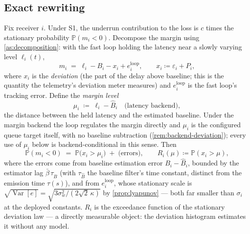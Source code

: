 \documentclass[11pt, a4paper]{article}
\theoremstyle{definition}
\theoremstyle{plain}
\theoremstyle{remark}
\newcommand{\Prob}{\mathbb{P}}
\newcommand{\Var}{\operatorname{Var}}
\begin{document}
\subsection{Exact rewriting}\label{sec:indicator-exact}

Fix receiver $i$.  Under S1, the underrun contribution to the loss is
$c$ times the stationary probability $\Prob(m_i < 0)$.  Decompose the
margin using \cref{as:decomposition}: with the fast loop holding the
latency near a slowly varying level $\ell_i(t)$,
\begin{equation}\label{eq:margin-decomp}
  m_i \;=\; \ell_i - B_i - x_i + e_i^{\mathrm{loop}},
  \qquad
  x_i \coloneqq \varepsilon_i + P_i ,
\end{equation}
where $x_i$ is the \emph{deviation} (the part of the delay above
baseline; this is the quantity the telemetry's deviation meter measures)
and $e_i^{\mathrm{loop}}$ is the fast loop's tracking error.  Define the
\emph{margin level}
\begin{equation}\label{eq:margin-level}
  \mu_i \;\coloneqq\; \ell_i - \hat B_i
  \quad\text{(latency backend)},
\end{equation}
the distance between the held latency and the estimated baseline.
Under the margin backend the loop regulates the margin directly and
$\mu_i$ is the configured queue target itself, with no baseline
subtraction (\cref{rem:backend-deviation}); every use of $\mu_i$
below is backend-conditional in this sense.  Then
\begin{equation}\label{eq:R-def}
  \Prob(m_i < 0)
  \;=\;
  \Prob\bigl(x_i > \mu_i\bigr) \;+\; \text{(errors)},
  \qquad
  R_i(\mu) \coloneqq \Prob(x_i > \mu),
\end{equation}
where the errors come from baseline estimation error
$B_i - \hat B_i$, bounded by the estimator lag $\bar\beta\,\tau_{\hat B}$
(with $\tau_{\hat B}$ the baseline filter's time constant, distinct
from the emission time $\tau(s)$), and from
$e_i^{\mathrm{loop}}$, whose stationary scale is
$\sqrt{\Var[e]} = \sqrt{3\sigma_w^2/(2\sqrt2\,\kappa)}$ by
\cref{prop:lyapunov} --- both far smaller than $\sigma_i$ at the
deployed constants.  $R_i$ is the exceedance function of
the stationary deviation law --- a directly measurable object: the
deviation histogram estimates it without any model.
\end{document}

